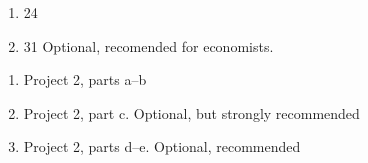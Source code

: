 \documentclass[12pt]{article}
\begin{document}
\begin{enumerate}
\setlength{\itemsep}{-1mm}
  \item 24
  \item 31 Optional, recomended for economists.
\end{enumerate}

\begin{enumerate}
\setlength{\itemsep}{-1mm}
  \item Project 2, parts a--b
  \item Project 2, part c. Optional, but strongly recommended
  \item Project 2, parts d--e. Optional, recommended
\end{enumerate}
\end{document}
